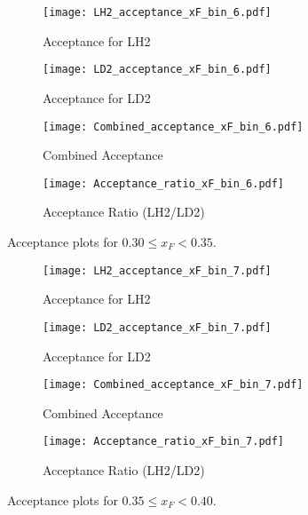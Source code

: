 \documentclass{article}
\begin{document}
\begin{figure}[H]
    \centering
    \begin{subfigure}[b]{0.48\textwidth}
       \texttt{[image: LH2\_acceptance\_xF\_bin\_6.pdf]}
       \caption{Acceptance for LH2}
    \end{subfigure}
    \hfill
    \begin{subfigure}[b]{0.48\textwidth}
       \texttt{[image: LD2\_acceptance\_xF\_bin\_6.pdf]}
       \caption{Acceptance for LD2}
    \end{subfigure}

    \begin{subfigure}[b]{0.48\textwidth}
       \texttt{[image: Combined\_acceptance\_xF\_bin\_6.pdf]}
       \caption{Combined Acceptance}
    \end{subfigure}
    \hfill
    \begin{subfigure}[b]{0.48\textwidth}
       \texttt{[image: Acceptance\_ratio\_xF\_bin\_6.pdf]}
       \caption{Acceptance Ratio (LH2/LD2)}
    \end{subfigure}
    \caption{Acceptance plots for $0.30 \le x_F < 0.35$.}
\end{figure}

\begin{figure}[H]
    \centering
    \begin{subfigure}[b]{0.48\textwidth}
       \texttt{[image: LH2\_acceptance\_xF\_bin\_7.pdf]}
       \caption{Acceptance for LH2}
    \end{subfigure}
    \hfill
    \begin{subfigure}[b]{0.48\textwidth}
       \texttt{[image: LD2\_acceptance\_xF\_bin\_7.pdf]}
       \caption{Acceptance for LD2}
    \end{subfigure}

    \begin{subfigure}[b]{0.48\textwidth}
       \texttt{[image: Combined\_acceptance\_xF\_bin\_7.pdf]}
       \caption{Combined Acceptance}
    \end{subfigure}
    \hfill
    \begin{subfigure}[b]{0.48\textwidth}
       \texttt{[image: Acceptance\_ratio\_xF\_bin\_7.pdf]}
       \caption{Acceptance Ratio (LH2/LD2)}
    \end{subfigure}
    \caption{Acceptance plots for $0.35 \le x_F < 0.40$.}
\end{figure}
\end{document}
